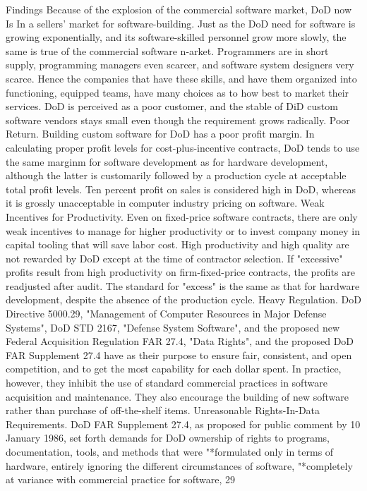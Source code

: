\documentclass[12pt]{article}
\begin{document}
Findings
Because of the explosion of the commercial software market, DoD now Is
In a sellers' market for software-building.
Just as the DoD need for software is growing exponentially, and its software-skilled personnel grow more slowly, the same is true of the commercial software n-arket. Programmers
are in short supply, programming managers even scarcer, and software system designers
very scarce. Hence the companies that have these skills, and have them organized into
functioning, equipped teams, have many choices as to how best to market their services.
DoD is perceived as a poor customer, and the stable of DiD custom software
vendors stays small even though the requirement grows radically.
Poor Return. Building custom software for DoD has a poor profit margin. In calculating
proper profit levels for cost-plus-incentive contracts, DoD tends to use the same marginm
for software development as for hardware development, although the latter is customarily
followed by a production cycle at acceptable total profit levels. Ten percent profit on sales
is considered high in DoD, whereas it is grossly unacceptable in computer industry pricing
on software.
Weak Incentives for Productivity.
Even on fixed-price software contracts, there
are only weak incentives to manage for higher productivity or to invest company money
in capital tooling that will save labor cost. High productivity and high quality are not
rewarded by DoD except at the time of contractor selection. If "excessive" profits result
from high productivity on firm-fixed-price contracts, the profits are readjusted after audit.
The standard for "excess" is the same as that for hardware development, despite the
absence of the production cycle.
Heavy Regulation. DoD Directive 5000.29, "Management of Computer Resources in
Major Defense Systems", DoD STD 2167, "Defense System Software", and the proposed
new Federal Acquisition Regulation FAR 27.4, "Data Rights", and the proposed DoD FAR
Supplement 27.4 have as their purpose to ensure fair, consistent, and open competition,
and to get the most capability for each dollar spent. In practice, however, they inhibit the
use of standard commercial practices in software acquisition and maintenance. They also
encourage the building of new software rather than purchase of off-the-shelf items.
Unreasonable Rights-In-Data Requirements.
DoD FAR Supplement 27.4, as
proposed for public comment by 10 January 1986, set forth demands for DoD ownership
of rights to programs, documentation, tools, and methods that were
"*formulated only in terms of hardware, entirely ignoring the different circumstances
of software,
"*completely at variance with commercial practice for software,
29
\end{document}

